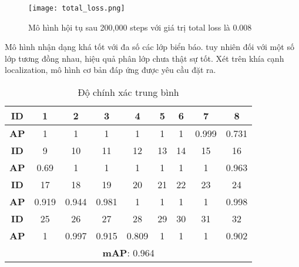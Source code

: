 \documentclass[../thesis.tex]{subfiles}
\begin{document}

\begin{figure}[H]
	\centering
	\texttt{[image: total\_loss.png]}
	\caption{Mô hình hội tụ sau 200,000 steps với giá trị total loss là 0.008}\label{Fig:total_loss.png}
\end{figure}


Mô hình nhận dạng khá tốt với đa số các lớp biển báo. tuy nhiên đối với một số lớp tương đồng nhau, hiệu quả phân lớp chưa thật sự tốt. Xét trên khía cạnh localization, mô hình cơ bản đáp ứng được yêu cầu đặt ra.
\\


\begin{table}[H]
\noindent
\centering
\begin{tabular}{|c|c|c|c|c|c|c|c|c|}
	\hline
	\textbf{ID} & 1  & 2  & 3  & 4  & 5  & 6  & 7  & 8\\
	\hline
	\textbf{AP} & 1  & 1  & 1  & 1  & 1  & 1  & 0.999 & 0.731\\
	\hline\hline
	
	\textbf{ID} & 9 & 10 & 11 & 12 & 13 & 14 & 15 & 16\\
	\hline
	\textbf{AP} & 0.69 & 1 & 1 & 1 & 1 & 1 & 1 & 0.963\\
	\hline\hline
	
	\textbf{ID} & 17 & 18 & 19 & 20 & 21 & 22 & 23 & 24\\
	\hline
	\textbf{AP} & 0.919 & 0.944 & 0.981 & 1 & 1 & 1 & 1 & 0.998\\
	\hline\hline
	
	\textbf{ID} & 25 & 26 & 27 & 28 & 29 & 30 & 31 & 32\\
	\hline
	\textbf{AP} & 1 & 0.997 & 0.915 & 0.809 & 1 & 1 & 1 & 0.902\\
	\hline\hline
	\multicolumn{9}{|c|}{\textbf{mAP}: 0.964}\\
	\hline
\end{tabular}
\caption{Độ chính xác trung bình}
\label{Table:mAP}
\end{table}
\end{document}
